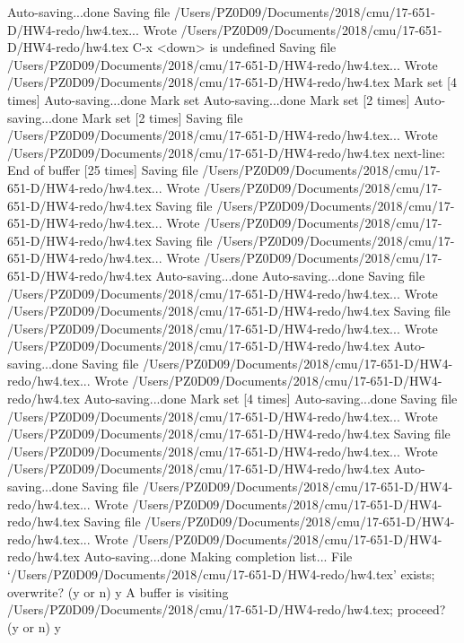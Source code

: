 Auto-saving...done
Saving file /Users/PZ0D09/Documents/2018/cmu/17-651-D/HW4-redo/hw4.tex...
Wrote /Users/PZ0D09/Documents/2018/cmu/17-651-D/HW4-redo/hw4.tex
C-x <down> is undefined
Saving file /Users/PZ0D09/Documents/2018/cmu/17-651-D/HW4-redo/hw4.tex...
Wrote /Users/PZ0D09/Documents/2018/cmu/17-651-D/HW4-redo/hw4.tex
Mark set [4 times]
Auto-saving...done
Mark set
Auto-saving...done
Mark set [2 times]
Auto-saving...done
Mark set [2 times]
Saving file /Users/PZ0D09/Documents/2018/cmu/17-651-D/HW4-redo/hw4.tex...
Wrote /Users/PZ0D09/Documents/2018/cmu/17-651-D/HW4-redo/hw4.tex
next-line: End of buffer [25 times]
Saving file /Users/PZ0D09/Documents/2018/cmu/17-651-D/HW4-redo/hw4.tex...
Wrote /Users/PZ0D09/Documents/2018/cmu/17-651-D/HW4-redo/hw4.tex
Saving file /Users/PZ0D09/Documents/2018/cmu/17-651-D/HW4-redo/hw4.tex...
Wrote /Users/PZ0D09/Documents/2018/cmu/17-651-D/HW4-redo/hw4.tex
Saving file /Users/PZ0D09/Documents/2018/cmu/17-651-D/HW4-redo/hw4.tex...
Wrote /Users/PZ0D09/Documents/2018/cmu/17-651-D/HW4-redo/hw4.tex
Auto-saving...done
Auto-saving...done
Saving file /Users/PZ0D09/Documents/2018/cmu/17-651-D/HW4-redo/hw4.tex...
Wrote /Users/PZ0D09/Documents/2018/cmu/17-651-D/HW4-redo/hw4.tex
Saving file /Users/PZ0D09/Documents/2018/cmu/17-651-D/HW4-redo/hw4.tex...
Wrote /Users/PZ0D09/Documents/2018/cmu/17-651-D/HW4-redo/hw4.tex
Auto-saving...done
Saving file /Users/PZ0D09/Documents/2018/cmu/17-651-D/HW4-redo/hw4.tex...
Wrote /Users/PZ0D09/Documents/2018/cmu/17-651-D/HW4-redo/hw4.tex
Auto-saving...done
Mark set [4 times]
Auto-saving...done
Saving file /Users/PZ0D09/Documents/2018/cmu/17-651-D/HW4-redo/hw4.tex...
Wrote /Users/PZ0D09/Documents/2018/cmu/17-651-D/HW4-redo/hw4.tex
Saving file /Users/PZ0D09/Documents/2018/cmu/17-651-D/HW4-redo/hw4.tex...
Wrote /Users/PZ0D09/Documents/2018/cmu/17-651-D/HW4-redo/hw4.tex
Auto-saving...done
Saving file /Users/PZ0D09/Documents/2018/cmu/17-651-D/HW4-redo/hw4.tex...
Wrote /Users/PZ0D09/Documents/2018/cmu/17-651-D/HW4-redo/hw4.tex
Saving file /Users/PZ0D09/Documents/2018/cmu/17-651-D/HW4-redo/hw4.tex...
Wrote /Users/PZ0D09/Documents/2018/cmu/17-651-D/HW4-redo/hw4.tex
Auto-saving...done
Making completion list...
File ‘/Users/PZ0D09/Documents/2018/cmu/17-651-D/HW4-redo/hw4.tex’ exists; overwrite? (y or n) y
A buffer is visiting /Users/PZ0D09/Documents/2018/cmu/17-651-D/HW4-redo/hw4.tex; proceed? (y or n) y
